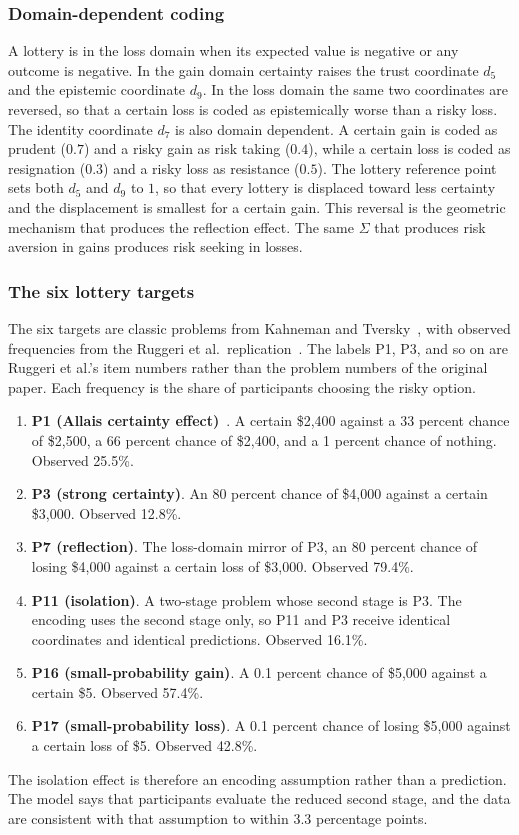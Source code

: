 \documentclass[journal]{IEEEtran}
\begin{document}
\subsubsection{Domain-dependent coding}
A lottery is in the loss domain when its expected value is negative or any outcome is negative.
In the gain domain certainty raises the trust coordinate $d_5$ and the epistemic coordinate $d_9$.
In the loss domain the same two coordinates are reversed, so that a certain loss is coded as epistemically worse than a risky loss.
The identity coordinate $d_7$ is also domain dependent.
A certain gain is coded as prudent ($0.7$) and a risky gain as risk taking ($0.4$), while a certain loss is coded as resignation ($0.3$) and a risky loss as resistance ($0.5$).
The lottery reference point sets both $d_5$ and $d_9$ to $1$, so that every lottery is displaced toward less certainty and the displacement is smallest for a certain gain.
This reversal is the geometric mechanism that produces the reflection effect.
The same $\Sigma$ that produces risk aversion in gains produces risk seeking in losses.

\subsubsection{The six lottery targets}
The six targets are classic problems from Kahneman and Tversky~\cite{kahneman1979}, with observed frequencies from the Ruggeri et al.\ replication~\cite{ruggeri2020}.
The labels P1, P3, and so on are Ruggeri et al.'s item numbers rather than the problem numbers of the original paper.
Each frequency is the share of participants choosing the risky option.
\begin{enumerate}
    \item \textbf{P1 (Allais certainty effect)}~\cite{allais1953}. A certain \$2,400 against a 33 percent chance of \$2,500, a 66 percent chance of \$2,400, and a 1 percent chance of nothing. Observed 25.5\%.
    \item \textbf{P3 (strong certainty)}. An 80 percent chance of \$4,000 against a certain \$3,000. Observed 12.8\%.
    \item \textbf{P7 (reflection)}. The loss-domain mirror of P3, an 80 percent chance of losing \$4,000 against a certain loss of \$3,000. Observed 79.4\%.
    \item \textbf{P11 (isolation)}. A two-stage problem whose second stage is P3. The encoding uses the second stage only, so P11 and P3 receive identical coordinates and identical predictions. Observed 16.1\%.
    \item \textbf{P16 (small-probability gain)}. A 0.1 percent chance of \$5,000 against a certain \$5. Observed 57.4\%.
    \item \textbf{P17 (small-probability loss)}. A 0.1 percent chance of losing \$5,000 against a certain loss of \$5. Observed 42.8\%.
\end{enumerate}
The isolation effect is therefore an encoding assumption rather than a prediction.
The model says that participants evaluate the reduced second stage, and the data are consistent with that assumption to within 3.3 percentage points.
\end{document}

